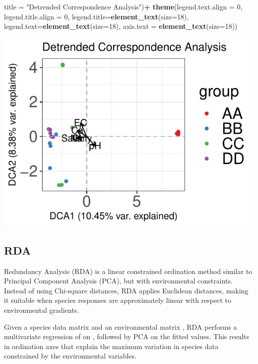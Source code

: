 \documentclass[
]{article}
\newenvironment{Shaded}{\begin{snugshade}}{\end{snugshade}}
\newcommand{\AttributeTok}[1]{\textcolor[rgb]{0.13,0.29,0.53}{#1}}
\newcommand{\DecValTok}[1]{\textcolor[rgb]{0.00,0.00,0.81}{#1}}
\newcommand{\FunctionTok}[1]{\textcolor[rgb]{0.13,0.29,0.53}{\textbf{#1}}}
\newcommand{\NormalTok}[1]{#1}
\newcommand{\SpecialCharTok}[1]{\textcolor[rgb]{0.81,0.36,0.00}{\textbf{#1}}}
\newcommand{\StringTok}[1]{\textcolor[rgb]{0.31,0.60,0.02}{#1}}
\begin{document}
\begin{Shaded}
\begin{Highlighting}[]
         \AttributeTok{title =} \StringTok{"Detrended Correspondence Analysis"}\NormalTok{)}\SpecialCharTok{+}
    \FunctionTok{theme}\NormalTok{(}\AttributeTok{legend.text.align =} \DecValTok{0}\NormalTok{, }\AttributeTok{legend.title.align =} \DecValTok{0}\NormalTok{,}
      \AttributeTok{legend.title=}\FunctionTok{element\_text}\NormalTok{(}\AttributeTok{size=}\DecValTok{18}\NormalTok{),}
      \AttributeTok{legend.text=}\FunctionTok{element\_text}\NormalTok{(}\AttributeTok{size=}\DecValTok{18}\NormalTok{),}
      \AttributeTok{axis.text =} \FunctionTok{element\_text}\NormalTok{(}\AttributeTok{size=}\DecValTok{18}\NormalTok{))}
\end{Highlighting}
\end{Shaded}

\includegraphics{workshop_files/figure-latex/unnamed-chunk-33-1.pdf}

\hypertarget{rda}{%
\subsection{RDA}\label{rda}}

Redundancy Analysis (RDA) is a linear constrained ordination method
similar to Principal Component Analysis (PCA), but with environmental
constraints. Instead of using Chi-square distances, RDA applies
Euclidean distances, making it suitable when species responses are
approximately linear with respect to environmental gradients.

Given a species data matrix and an environmental matrix , RDA performs a
multivariate regression of on , followed by PCA on the fitted values.
This results in ordination axes that explain the maximum variation in
species data constrained by the environmental variables.
\end{document}
